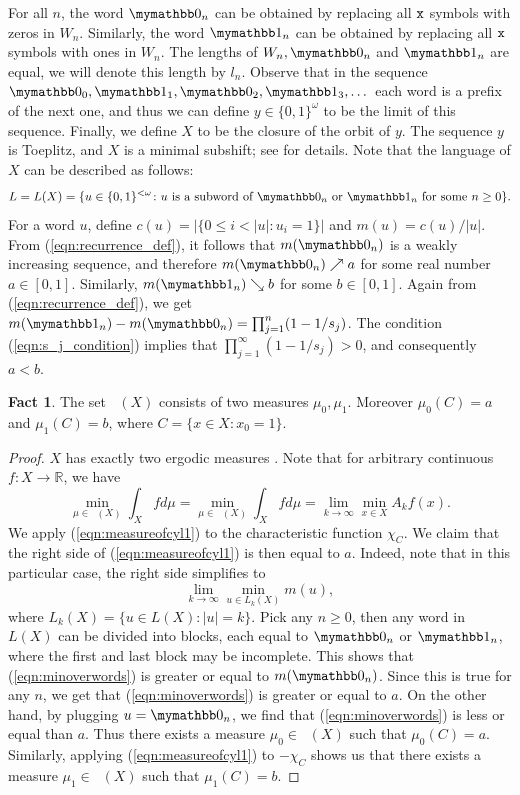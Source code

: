 \documentclass{amsart}
\theoremstyle{definition}
\newtheorem{fact}[thm]{Fact}
\DeclareMathOperator{\M}{\mathcal{M}}
\DeclareMathOperator{\MT}{\mathcal{M}_{\mathit T} }
\DeclareMathOperator{\MTe}{\M_{\mathit T}^e}
\newcommand{\R}{\mathbb{R}}
\begin{document}
For all $n$, the word $\zero_n$ can be obtained by replacing all $\mathtt{x}$ symbols with zeros in $W_n$.
Similarly, the word $\one_n$ can be obtained by replacing all $\mathtt{x}$ symbols with ones in $W_n$.
The lengths of $W_n, \zero_n$ and $\one_n$ are equal, we will denote this length by $l_n$.
Observe that in the sequence $\zero_0, \one_1, \zero_2, \one_3, \dots$ each word is a prefix of the next one,
and thus we can define $y \in \{0, 1\}^\omega$ to be the limit of this sequence.
Finally, we define $X$ to be the closure of the orbit of $y$.
The sequence $y$ is Toeplitz, and $X$ is a minimal subshift; see \cite{Downarowicz} for details.
Note that the language of $X$ can be described as follows:
$$
	L = L(X) = \{ u \in \{0, 1\}^{< \omega} \colon u \textrm{ is a subword of } \zero_n
	\textrm{ or } \one_n \textrm{ for some } n \ge 0 \}.
$$
For a word $u$, define $c(u) = | \{ 0 \le i < |u| \colon u_i = 1\}|$ and $m(u) = c(u) / |u|.$
From (\ref{eqn:recurrence_def}), it follows that $m(\zero_n)$ is a weakly increasing sequence, and therefore $ m(\zero_n) \nearrow a$ for some real number $a \in [0, 1]$. Similarly, $m(\one_n) \searrow b$ for some $b \in [0, 1]$. Again from (\ref{eqn:recurrence_def}), we get $m(\one_n) - m(\zero_n) = \prod_{j=1}^n (1 - 1/s_j)$.
The condition (\ref{eqn:s_j_condition}) implies that $\prod_{j=1}^\infty (1 - 1/s_j) > 0$, and consequently $a < b$.

\begin{fact} \label{fact:twoergmeasures}
	The set $\MTe(X)$ consists of two measures $\mu_0, \mu_1$. Moreover $\mu_0(C) = a$ and $\mu_1(C) = b$,
	where $C = \{ x \in X : x_0 = 1 \}$.
\end{fact}
\begin{proof}
$X$ has exactly two ergodic measures \cite[Chapter 14]{Downarowicz}.
Note that for arbitrary continuous $f \colon X \to \R$, we have
\begin{equation} \label{eqn:measureofcyl1}
	\min_{\mu \in \MTe(X)} \int_X f d \mu =
	\min_{\mu \in \MT(X)} \int_X f d \mu =
	\lim_{k \to \infty} \min_{x \in X} A_k f(x).
\end{equation}
We apply (\ref{eqn:measureofcyl1}) to the characteristic function $\chi_C$.
We claim that the right side of (\ref{eqn:measureofcyl1}) is then equal to $a$. Indeed, note that in this particular case, the right side simplifies to
\begin{equation} \label{eqn:minoverwords}
	\lim_{k \to \infty} \min_{u \in L_k(X)} m(u),
\end{equation}
where $L_k(X) = \{ u \in L(X) \colon |u| = k \}$.
Pick any $n \ge 0$, then any word in $L(X)$ can be divided into blocks,
each equal to $\zero_n$ or $\one_n$, where the first and last block may be incomplete.
This shows that (\ref{eqn:minoverwords}) is greater or equal to $m(\zero_n)$.
Since this is true for any $n$, we get that (\ref{eqn:minoverwords}) is greater or equal to $a$.
On the other hand, by plugging $u = \zero_n$, we find that (\ref{eqn:minoverwords}) is less or equal than $a$.
Thus there exists a measure $\mu_0 \in \MTe(X)$ such that $\mu_0(C) = a$.
Similarly, applying (\ref{eqn:measureofcyl1}) to $- \chi_C$ shows us that
there exists a measure $\mu_1 \in \MTe(X)$ such that $\mu_1(C) = b$.
\end{proof}
\end{document}
